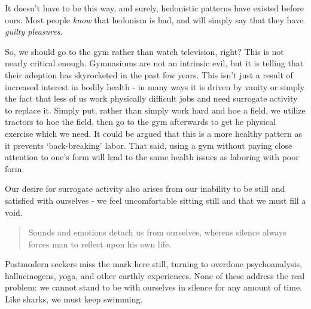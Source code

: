 \documentclass[letterpaper]{article}
\begin{document}
It doesn't have to be this way, and surely, hedonistic patterns have existed before ours. Most people \textit{know} that hedonism is bad, and will simply say that they have \textit{guilty pleasures}.

So, we should go to the gym rather than watch television, right? This is not nearly critical enough. Gymnasiums are not an intrinsic evil, but it is telling that their adoption has skyrocketed in the past few years. This isn't just a result of increased interest in bodily health - in many ways it is driven by vanity or simply the fact that less of us work physically difficult jobs and need surrogate activity to replace it. Simply put, rather than simply work hard and hoe a field, we utilize tractors to hoe the field, then go to the gym afterwards to get he physical exercise which we need. It could be argued that this is a more healthy pattern as it prevents `back-breaking' labor. That said, using a gym without paying close attention to one's form will lead to the same health issues as laboring with poor form.

Our desire for surrogate activity also arises from our inability to be still and satisfied with ourselves - we feel uncomfortable sitting still and that we must fill a void.

\begin{quote}
  Sounds and emotions detach us from ourselves, whereas silence always forces man to reflect upon his own life.
\end{quote}

Postmodern seekers miss the mark here still, turning to overdone psychoanalysis, hallucinogens, yoga, and other earthly experiences. None of these address the real problem: we cannot stand to be with ourselves in silence for any amount of time. Like sharks, we must keep swimming.


\iffalse
\begin{quote}
  One should remember that it is in accordance with the taste of one's heart that the future eternal mansion will be given, and that the taste in one's heart there will be the very one that is formed here. It is evident that theaters, shows, and similar things are not suitable for Christians.
  \attrib{\textit{The Path to Salvation} 60, St. Theophan the Recluse 1996}
\end{quote}
\fi

\iffalse
\end{document}

